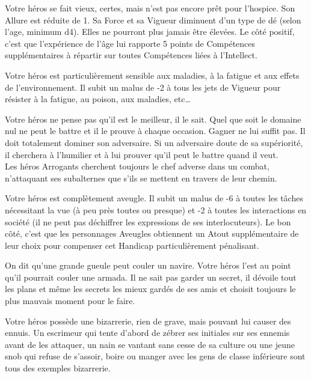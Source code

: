 \begin{description}[align=left]
    \item [Âgé (Majeur)]
        Votre héros se fait vieux, certes, mais n'est pas encore prêt pour l'hospice. Son Allure est réduite de 1. Sa Force et sa Vigueur diminuent d’un type de dé (selon l'age, minimum d4). Elles ne pourront plus jamais être élevées. Le côté positif, c’est que l’expérience de l'âge lui rapporte 5 points de Compétences supplémentaires à répartir sur toutes Compétences liées à l'Intellect.

    \item [Anémique (Mineur)]
        Votre héros est particulièrement sensible aux maladies, à la fatigue et aux effets de l'environnement. Il subit un malus de -2 à tous les jets de Vigueur pour résister à la fatigue, au poison, aux maladies, etc\ldots

    \item [Arrogant (Majeur)]
        Votre héros ne pense pas qu'il est le meilleur, il le sait. Quel que soit le domaine nul ne peut le battre et il le prouve à chaque occasion. Gagner ne lui suffit pas. Il doit totalement dominer son adversaire. Si un adversaire doute de sa supériorité, il cherchera à l'humilier et à lui prouver qu'il peut le battre quand il veut.\\
        Les héros Arrogants cherchent toujours le chef adverse dans un combat, n'attaquant ses subalternes que s'ils se mettent en travers de leur chemin.

    \item [Aveugle (Majeur)]
        Votre héros est complètement aveugle. Il subit un malus de -6 à toutes les tâches nécessitant la vue (à peu près toutes ou presque) et -2 à toutes les interactions en société (il ne peut pas déchiffrer les expressions de ses interlocuteurs). Le bon côté, c'est que les personnages Aveugles obtiennent un Atout supplémentaire de leur choix pour compenser cet Handicap particulièrement pénalisant.

    \item [Bavard (Mineur)]
        On dit qu'une grande gueule peut couler un navire. Votre héros l'est au point qu'il pourrait couler une armada. Il ne sait pas garder un secret, il dévoile tout les plans et même les secrets les mieux gardés de ses amis et choisit toujours le plus mauvais moment pour le faire.

    \item [Bizarrerie (Mineur)]
        Votre héros possède une bizarrerie, rien de grave, mais pouvant lui causer des ennuis. Un escrimeur qui tente d'abord de zébrer ses initiales sur ses ennemis avant de les attaquer, un nain se vantant sans cesse de sa culture ou une jeune snob qui refuse de s'assoir, boire ou manger avec les gens de classe inférieure sont tous des exemples bizarrerie.


\end{description}
